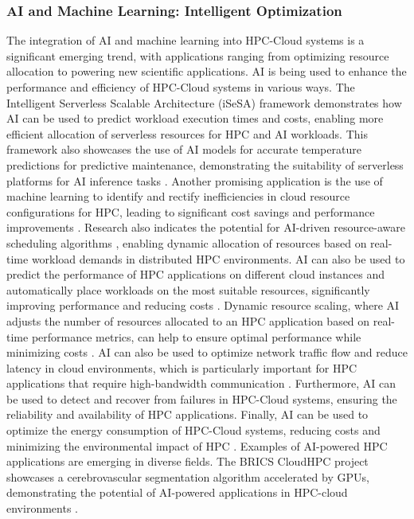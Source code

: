     \subsubsection{AI and Machine Learning: Intelligent Optimization}
    \label{subsec:ai_ml}
    The integration of AI and machine learning into HPC-Cloud systems is a significant emerging trend, with applications ranging from optimizing resource allocation to powering new scientific applications.  AI is being used to enhance the performance and efficiency of HPC-Cloud systems in various ways. The Intelligent Serverless Scalable Architecture (iSeSA) framework \cite{chahal_isesa_2022} demonstrates how AI can be used to predict workload execution times and costs, enabling more efficient allocation of serverless resources for HPC and AI workloads. This framework also showcases the use of AI models for accurate temperature predictions for predictive maintenance, demonstrating the suitability of serverless platforms for AI inference tasks \cite{chahal_isesa_2022}. Another promising application is the use of machine learning to identify and rectify inefficiencies in cloud resource configurations for HPC, leading to significant cost savings and performance improvements \cite{michalewicz_attempt_2023}.
    Research also indicates the potential for AI-driven resource-aware scheduling algorithms \cite{silva_review_2024}, enabling dynamic allocation of resources based on real-time workload demands in distributed HPC environments. AI can also be used to predict the performance of HPC applications on different cloud instances and automatically place workloads on the most suitable resources, significantly improving performance and reducing costs \cite{liang_scalable_2022}. Dynamic resource scaling, where AI adjusts the number of resources allocated to an HPC application based on real-time performance metrics, can help to ensure optimal performance while minimizing costs \cite{eberius_evaluating_2023}. AI can also be used to optimize network traffic flow and reduce latency in cloud environments, which is particularly important for HPC applications that require high-bandwidth communication \cite{alves_interference-aware_2020}. Furthermore, AI can be used to detect and recover from failures in HPC-Cloud systems, ensuring the reliability and availability of HPC applications. Finally, AI can be used to optimize the energy consumption of HPC-Cloud systems, reducing costs and minimizing the environmental impact of HPC \cite{silva_review_2024}.
    Examples of AI-powered HPC applications are emerging in diverse fields. The BRICS CloudHPC project showcases a cerebrovascular segmentation algorithm accelerated by GPUs, demonstrating the potential of AI-powered applications in HPC-cloud environments \cite{noauthor_harnessing_nodate}.
